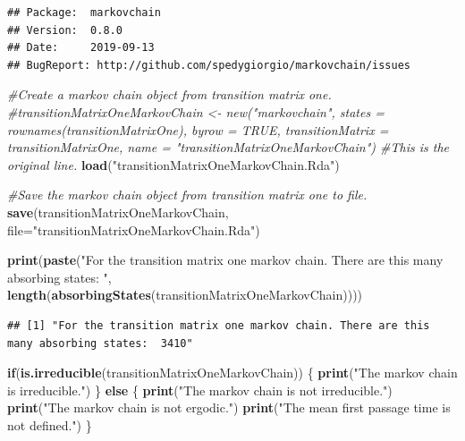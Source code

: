 \documentclass[
]{article}
\newenvironment{Shaded}{\begin{snugshade}}{\end{snugshade}}
\newcommand{\CommentTok}[1]{\textcolor[rgb]{0.56,0.35,0.01}{\textit{#1}}}
\newcommand{\ControlFlowTok}[1]{\textcolor[rgb]{0.13,0.29,0.53}{\textbf{#1}}}
\newcommand{\DataTypeTok}[1]{\textcolor[rgb]{0.13,0.29,0.53}{#1}}
\newcommand{\KeywordTok}[1]{\textcolor[rgb]{0.13,0.29,0.53}{\textbf{#1}}}
\newcommand{\NormalTok}[1]{#1}
\newcommand{\StringTok}[1]{\textcolor[rgb]{0.31,0.60,0.02}{#1}}
\begin{document}
\begin{verbatim}
## Package:  markovchain
## Version:  0.8.0
## Date:     2019-09-13
## BugReport: http://github.com/spedygiorgio/markovchain/issues
\end{verbatim}

\begin{Shaded}
\begin{Highlighting}[]
\CommentTok{#Create a markov chain object from transition matrix one.}
\CommentTok{#transitionMatrixOneMarkovChain <- new("markovchain", states = rownames(transitionMatrixOne), byrow = TRUE, transitionMatrix = transitionMatrixOne, name = "transitionMatrixOneMarkovChain") #This is the original line.}
\KeywordTok{load}\NormalTok{(}\StringTok{"transitionMatrixOneMarkovChain.Rda"}\NormalTok{)}

\CommentTok{#Save the markov chain object from transition matrix one to file.}
\KeywordTok{save}\NormalTok{(transitionMatrixOneMarkovChain, }\DataTypeTok{file=}\StringTok{"transitionMatrixOneMarkovChain.Rda"}\NormalTok{)}

\KeywordTok{print}\NormalTok{(}\KeywordTok{paste}\NormalTok{(}\StringTok{"For the transition matrix one markov chain. There are this many absorbing states: "}\NormalTok{, }\KeywordTok{length}\NormalTok{(}\KeywordTok{absorbingStates}\NormalTok{(transitionMatrixOneMarkovChain))))}
\end{Highlighting}
\end{Shaded}

\begin{verbatim}
## [1] "For the transition matrix one markov chain. There are this many absorbing states:  3410"
\end{verbatim}

\begin{Shaded}
\begin{Highlighting}[]
\ControlFlowTok{if}\NormalTok{(}\KeywordTok{is.irreducible}\NormalTok{(transitionMatrixOneMarkovChain)) \{}
  \KeywordTok{print}\NormalTok{(}\StringTok{"The markov chain is irreducible."}\NormalTok{)}
\NormalTok{\} }\ControlFlowTok{else}\NormalTok{ \{}
  \KeywordTok{print}\NormalTok{(}\StringTok{"The markov chain is not irreducible."}\NormalTok{)}
  \KeywordTok{print}\NormalTok{(}\StringTok{"The markov chain is not ergodic."}\NormalTok{)}
  \KeywordTok{print}\NormalTok{(}\StringTok{"The mean first passage time is not defined."}\NormalTok{)}
\NormalTok{\}}
\end{Highlighting}
\end{Shaded}
\end{document}
